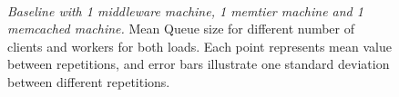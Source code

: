 \documentclass[11pt,a4paper]{article}
\begin{document}
\begin{figure}[ht]
	\centering	
	\hfill
	\\
	\caption{\textit{Baseline with 1 middleware machine, 1 memtier machine and 1 memcached machine.} Mean Queue size for different number of clients and workers for both loads.  Each point represents mean value between repetitions, and error bars illustrate one standard deviation between different repetitions.}
	\label{Figure:baseline_1midd_queue}	
\end{figure}
\end{document}
